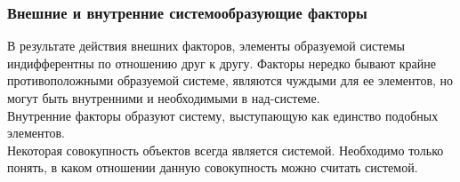 \documentclass{article}
\begin{document}
\subsubsection*{Внешние и внутренние системообразующие факторы}
В результате действия внешних факторов, элементы образуемой системы индифферентны по отношению друг к другу. Факторы нередко бывают крайне противоположными образуемой системе, являются чуждыми для ее элементов, но могут быть внутренними и необходимыми в над-системе.
\\
Внутренние факторы образуют систему, выступающую как единство подобных элементов.
\\
Некоторая совокупность объектов всегда является системой. Необходимо только понять, в каком отношении данную совокупность можно считать системой.
\end{document}

